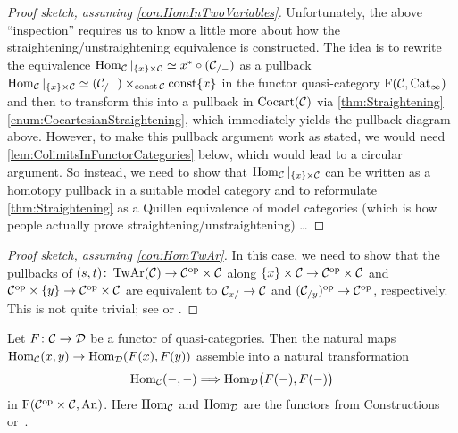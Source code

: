 \begin{proof}[Proof sketch, assuming \cref{con:HomInTwoVariables}]
	Unfortunately, the above \enquote{inspection} requires us to know a little more about how the straightening/unstraightening equivalence is constructed. The idea is to rewrite the equivalence $\operatorname{Hom}_{\mathcal{C}}|_{\{x\}\times\mathcal{C}}\simeq x^*\circ (\mathcal{C}_{/-})$ as a pullback $\operatorname{Hom}_{\mathcal{C}}|_{\{x\}\times\mathcal{C}}\simeq (\mathcal{C}_{/-})\times_{\operatorname{const} \mathcal{C}}\operatorname{const} \{x\}$ in the functor quasi-category $\operatorname{F}(\mathcal{C},\mathrm{Cat}_\infty)$ and then to transform this into a pullback in $\mathrm{Cocart}(\mathcal{C})$ via \cref{thm:Straightening}\cref{enum:CocartesianStraightening}, which immediately yields the pullback diagram above. However, to make this pullback argument work as stated, we would need \cref{lem:ColimitsInFunctorCategories} below, which would lead to a circular argument. So instead, we need to show that $\operatorname{Hom}_{\mathcal{C}}|_{\{x\}\times\mathcal{C}}$ can be written as a homotopy pullback in a suitable model category and to reformulate \cref{thm:Straightening} as a Quillen equivalence of model categories (which is how people actually prove straightening/unstraightening) \ldots
\end{proof}
\begin{proof}[Proof sketch, assuming \cref{con:HomTwAr}]
	In this case, we need to show that the pullbacks of $(s,t)\colon \operatorname{TwAr}(\mathcal{C})\rightarrow \mathcal{C}^{\mathrm{op}}\times\mathcal{C}$ along $\{x\}\times\mathcal{C}\rightarrow\mathcal{C}^{\mathrm{op}}\times\mathcal{C}$ and $\mathcal{C}^{\mathrm{op}}\times\{y\}\rightarrow\mathcal{C}^{\mathrm{op}}\times\mathcal{C}$ are equivalent to $\mathcal{C}_{x/}\rightarrow\mathcal{C}$ and $(\mathcal{C}_{/y})^{\mathrm{op}}\rightarrow\mathcal{C}^{\mathrm{op}}$, respectively. This is not quite trivial; see \cite[Proposition~]{HA} or \cite[Lemma~4.2.7]{Land}.
\end{proof}
\begin{lem}\label{lem:HomFunctorial}
	Let $F\colon \mathcal{C}\rightarrow\mathcal{D}$ be a functor of quasi-categories. Then the natural maps $\operatorname{Hom}_{\mathcal{C}}(x,y)\rightarrow \operatorname{Hom}_{\mathcal{D}}(F(x),F(y))$ assemble into a natural transformation
	\begin{equation*}
		\Hom_\Cc(-,-)\Longrightarrow \Hom_\Dd\lef(F(-),F(-)\righ)
	\end{equation*}
	in $\operatorname{F}(\mathcal{C}^{\mathrm{op}}\times\mathcal{C},\mathrm{An})$. Here $\operatorname{Hom}_{\mathcal{C}}$ and $\operatorname{Hom}_{\mathcal{D}}$ are the functors from Constructions~ or~.
\end{lem}
